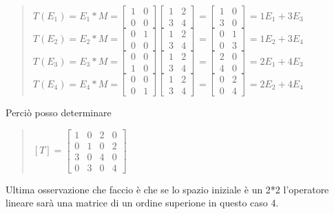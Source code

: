 \documentclass[a4paper]{article}
\begin{document}
\begin{quote} \centering $T(E_{1})= E_{1} *M= \left[\begin{matrix}1& 0\\ 0 & 0\end{matrix}\right]\left[\begin{matrix}1& 2 \\ 3 & 4\end{matrix}\right]= \left[\begin{matrix}1& 0 \\ 3 & 0\end{matrix}\right]= 1E_{1}+3E_{3}
$
\bigskip \\ $T(E_{2})= E_{2} *M= \left[\begin{matrix}0& 1\\ 0 & 0\end{matrix}\right]\left[\begin{matrix}1& 2 \\ 3 & 4\end{matrix}\right]= \left[\begin{matrix}0& 1 \\ 0 & 3\end{matrix}\right]= 1E_{2}+3E_{4}
$
\bigskip \\ $T(E_{3})= E_{3} *M= \left[\begin{matrix}0& 0\\ 1 & 0\end{matrix}\right]\left[\begin{matrix}1& 2 \\ 3 & 4\end{matrix}\right]= \left[\begin{matrix}2& 0 \\ 4 & 0\end{matrix}\right]= 2E_{1}+4E_{3}
$
\bigskip \\ $T(E_{4})= E_{4} *M= \left[\begin{matrix}0& 0\\ 0 & 1\end{matrix}\right]\left[\begin{matrix}1& 2 \\ 3 & 4\end{matrix}\right]= \left[\begin{matrix}0& 2\\ 0 & 4\end{matrix}\right]= 2E_{2}+4E_{4}
$\end{quote}
Perciò posso determinare 
\begin{quote} \centering $[T]=\left[\begin{matrix}1& 0&2&0\\ 0 & 1& 0 & 2\\3&0&4&0\\0&3&0&4\end{matrix}\right]
$ \end{quote}
Ultima osservazione che faccio è che se lo spazio iniziale è un 2*2 l'operatore lineare sarà una matrice di un ordine superione in questo caso 4.
\end{document}
